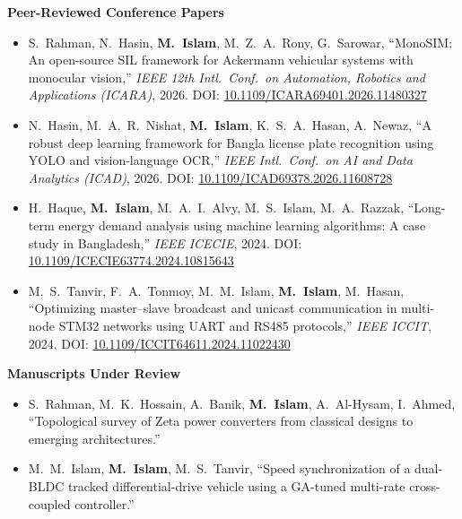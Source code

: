 \documentclass[10pt]{article}
\newcommand{\me}{\textbf{M.\ Islam}}
\begin{document}
\textbf{Peer-Reviewed Conference Papers}
\begin{itemize}
    \item S.\ Rahman, N.\ Hasin, \me, M.\ Z.\ A.\ Rony, G.\ Sarowar, ``MonoSIM: An open-source SIL
    framework for Ackermann vehicular systems with monocular vision,'' \textit{IEEE 12th Intl.\
    Conf.\ on Automation, Robotics and Applications (ICARA)}, 2026.
    DOI: \href{https://doi.org/10.1109/ICARA69401.2026.11480327}{10.1109/ICARA69401.2026.11480327}
    \item N.\ Hasin, M.\ A.\ R.\ Nishat, \me, K.\ S.\ A.\ Hasan, A.\ Newaz, ``A robust deep learning
    framework for Bangla license plate recognition using YOLO and vision-language OCR,''
    \textit{IEEE Intl.\ Conf.\ on AI and Data Analytics (ICAD)}, 2026.
    DOI: \href{https://doi.org/10.1109/ICAD69378.2026.11608728}{10.1109/ICAD69378.2026.11608728}
    \item H.\ Haque, \me, M.\ A.\ I.\ Alvy, M.\ S.\ Islam, M.\ A.\ Razzak, ``Long-term energy demand
    analysis using machine learning algorithms: A case study in Bangladesh,'' \textit{IEEE ICECIE},
    2024.
    DOI: \href{https://doi.org/10.1109/ICECIE63774.2024.10815643}{10.1109/ICECIE63774.2024.10815643}
    \item M.\ S.\ Tanvir, F.\ A.\ Tonmoy, M.\ M.\ Islam, \me, M.\ Hasan, ``Optimizing master--slave
    broadcast and unicast communication in multi-node STM32 networks using UART and RS485
    protocols,'' \textit{IEEE ICCIT}, 2024.
    DOI: \href{https://doi.org/10.1109/ICCIT64611.2024.11022430}{10.1109/ICCIT64611.2024.11022430}
\end{itemize}

\textbf{Manuscripts Under Review}
\begin{itemize}
    \item S.\ Rahman, M.\ K.\ Hossain, A.\ Banik, \me, A.\ Al-Hysam, I.\ Ahmed, ``Topological survey
    of Zeta power converters from classical designs to emerging architectures.''
    \item M.\ M.\ Islam, \me, M.\ S.\ Tanvir, ``Speed synchronization of a dual-BLDC tracked
    differential-drive vehicle using a GA-tuned multi-rate cross-coupled controller.''
\end{itemize}
\newpage

\end{document}
